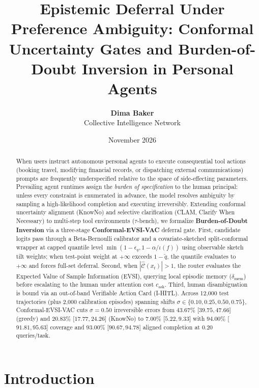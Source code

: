 \documentclass[11pt]{article}
\title{Epistemic Deferral Under Preference Ambiguity: Conformal Uncertainty Gates and Burden-of-Doubt Inversion in Personal Agents}
\author{\textbf{Dima Baker}\\
Collective Intelligence Network}
\date{November 2026}
\begin{document}
\maketitle

\begin{abstract}
When users instruct autonomous personal agents to execute consequential tool actions (booking travel, modifying financial records, or dispatching external communications) prompts are frequently underspecified relative to the space of side-effecting parameters. Prevailing agent runtimes assign the \emph{burden of specification} to the human principal: unless every constraint is enumerated in advance, the model resolves ambiguity by sampling a high-likelihood completion and executing irreversibly. Extending conformal uncertainty alignment (KnowNo) and selective clarification (CLAM, Clarify When Necessary) to multi-step tool environments ($\tau$-bench), we formalize \textbf{Burden-of-Doubt Inversion} via a three-stage \textbf{Conformal-EVSI-VAC} deferral gate. First, candidate logits pass through a Beta-Bernoulli calibrator and a covariate-sketched split-conformal wrapper at capped quantile level $\min(1-\epsilon_q, 1-\alpha/\iota(f))$ using observable sketch tilt weights; when test-point weight at $+\infty$ exceeds $1-\tilde{q}$, the quantile evaluates to $+\infty$ and forces full-set deferral. Second, when $|\hat{\mathcal{C}}(x_t)| > 1$, the router evaluates the Expected Value of Sample Information (EVSI), querying local episodic memory ($\delta_{\mathrm{mem}}$) before escalating to the human under attention cost $c_{\mathrm{ask}}$. Third, human disambiguation is bound via an out-of-band Verifiable Action Card (I-HITL). Across 12{,}000 test trajectories (plus 2{,}000 calibration episodes) spanning shifts $\sigma \in \{0.10, 0.25, 0.50, 0.75\}$, Conformal-EVSI-VAC cuts $\sigma=0.50$ irreversible errors from $43.67\%$ [$39.75, 47.66$] (greedy) and $20.83\%$ [$17.77, 24.26$] (KnowNo) to $7.00\%$ [$5.22, 9.33$] with $94.00\%$ [$91.81, 95.63$] coverage and $93.00\%$ [$90.67, 94.78$] aligned completion at $0.20$ queries/task.
\end{abstract}

\section{Introduction}\label{sec:intro}
\end{document}
